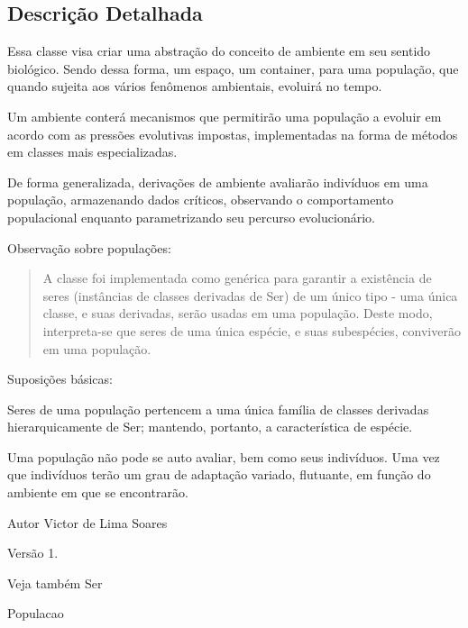 \subsection{Descrição Detalhada}
Essa classe visa criar uma abstração do conceito de ambiente em seu sentido biológico. Sendo dessa forma, um espaço, um container, para uma população, que quando sujeita aos vários fenômenos ambientais, evoluirá no tempo. 

Um ambiente conterá mecanismos que permitirão uma população a evoluir em acordo com as pressões evolutivas impostas, implementadas na forma de métodos em classes mais especializadas. 

De forma generalizada, derivações de {\ttfamily ambiente} avaliarão indivíduos em uma {\ttfamily população}, armazenando dados críticos, observando o comportamento populacional enquanto parametrizando seu percurso evolucionário. 

Observação sobre populações\-: \begin{quotation}
A classe foi implementada como genérica para garantir a existência de seres (instâncias de classes derivadas de {\ttfamily Ser}) de um único tipo -\/ uma única classe, e suas derivadas, serão usadas em uma {\ttfamily população}. Deste modo, interpreta-\/se que {\ttfamily seres} de uma única espécie, e suas subespécies, conviverão em uma {\ttfamily população}. \end{quotation}


Suposições básicas\-: 
\begin{DoxyItemize}
\item {\ttfamily Seres} de uma {\ttfamily população} pertencem a uma única família de classes derivadas hierarquicamente de {\ttfamily Ser}; mantendo, portanto, a característica de espécie. 
\item Uma {\ttfamily população} não pode se auto avaliar, bem como seus indivíduos. Uma vez que indivíduos terão um grau de adaptação variado, flutuante, em função do ambiente em que se encontrarão.  
\end{DoxyItemize}

\begin{DoxyAuthor}{Autor}
Victor de Lima Soares 
\end{DoxyAuthor}
\begin{DoxyVersion}{Versão}
1. 
\end{DoxyVersion}
\begin{DoxySeeAlso}{Veja também}
Ser 

Populacao 
\end{DoxySeeAlso}



